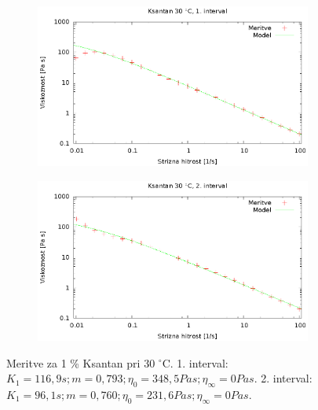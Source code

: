 \documentclass{article}
\begin{document}
\begin{figure}
	\centering
	\begin{subfigure}[b]{0.4\textwidth}
	       \includegraphics[width=\textwidth]{cross_ksan3.eps}
	   \end{subfigure}
	   \begin{subfigure}[b]{0.4\textwidth}
	       \includegraphics[width=\textwidth]{cross_ksan4.eps}
	   \end{subfigure}
	\caption{Meritve za 1 \% Ksantan pri 30 $^\circ$C. 1. interval: $K_1 = 116,9 s; m = 0,793; \eta_0 = 348,5 Pa s; \eta_\infty = 0 Pa s$. 2. interval: $K_1 = 96,1 s; m = 0,760; \eta_0 = 231,6 Pa s; \eta_\infty = 0 Pa s$.}
	\label{fig:cross_xan2}
\end{figure}
\end{document}
